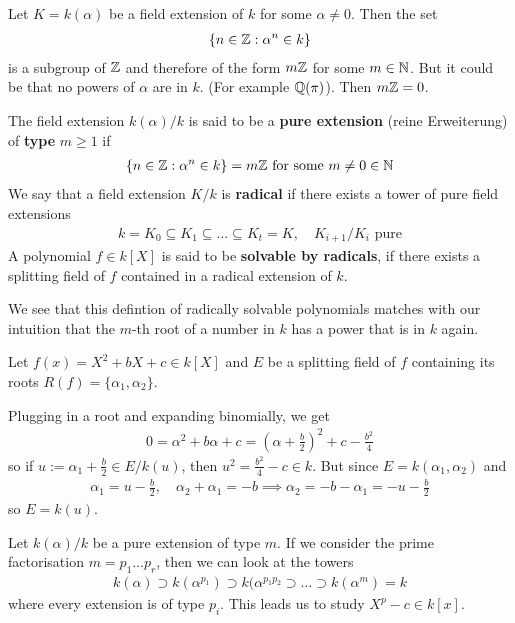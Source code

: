 Let $K = k(\alpha)$ be a field extension of $k$ for some $\alpha \neq0$. 
Then the set
\begin{align*}
  \{n \in \mathbb{Z}: \alpha^{n} \in k\}
\end{align*}
is a subgroup of $\mathbb{Z}$ and therefore of the form $m\mathbb{Z}$ for some $m \in \mathbb{N}$.
But it could be that no powers of $\alpha$ are in $k$. 
(For example $\mathbb{Q}(\pi)$).
Then $m\mathbb{Z} = 0$.

\begin{dfn}[]
  The field extension $k(\alpha)/k$ is said to be a \textbf{pure extension} (reine Erweiterung) of \textbf{type} $m \geq 1$ if
  \begin{align*}
    \{
    n \in \mathbb{Z}: \alpha^{n} \in k
    \} = m\mathbb{Z} \text{ for some } m \neq 0\in \mathbb{N}
  \end{align*}
  We say that a field extension $K/k$ is \textbf{radical} if there exists a tower of pure field extensions
  \begin{align*}
    k = K_0 \subseteq K_1 \subseteq \ldots \subseteq K_t = K,
    \quad K_{i+1}/K_i \text{ pure}
  \end{align*}
  A polynomial $f \in k[X]$ is said to be \textbf{solvable by radicals}, 
  if there exists a splitting field of $f$ contained in a radical extension of $k$.
\end{dfn}

We see that this defintion of radically solvable polynomials matches with our intuition that the $m$-th root of a number in $k$ has a power that is in $k$ again.
\begin{ex}[]
  Let $f(x) =X^{2}+ b X + c \in k[X]$ and $E$ be a splitting field of $f$ containing its roots $R(f) = \{\alpha_1,\alpha_2\}$.

  Plugging in a root and expanding binomially, we get
  \begin{align*}
    0 = \alpha^{2} + b \alpha + c = \left(
      \alpha + \tfrac{b}{2}
    \right)^{2} + c - \tfrac{b^{2}}{4}
  \end{align*}
so if $u := \alpha_1 + \tfrac{b}{2} \in E/k(u)$, then $u^{2} = \tfrac{b^{2}}{4}- c \in k$.
But since $E = k(\alpha_1,\alpha_2)$ and
\begin{align*}
  \alpha_1 = u - \tfrac{b}{2}, \quad \alpha_2 + \alpha_1 = -b \implies \alpha_2 = -b - \alpha_1 = -u - \tfrac{b}{2}
\end{align*}
so $E = k(u)$.
\end{ex}


Let $k(\alpha)/k$ be a pure extension of type $m$. 
If we consider the prime factorisation $m = p_1 \ldots p_r$, then we can look at the towers
\begin{align*}
  k(\alpha) \supset k(\alpha^{p_1}) \supset k(\alpha^{p_1p_2} \supset \ldots \supset k(\alpha^{m}) = k
\end{align*}
where every extension is of type $p_i$.
This leads us to study $X^{p} - c \in k[x]$.

